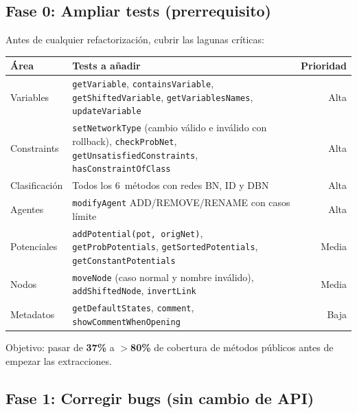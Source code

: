 \documentclass[11pt,a4paper]{article}
\newcommand{\code}[1]{\texttt{#1}}
\begin{document}
\subsection{Fase 0: Ampliar tests (prerrequisito)}

Antes de cualquier refactorizaci\'on, cubrir las lagunas cr\'iticas:

\begin{center}
\footnotesize
\begin{tabular}{lp{8cm}r}
\toprule
\textbf{\'Area} & \textbf{Tests a a\~nadir} & \textbf{Prioridad} \\
\midrule
Variables & \code{getVariable}, \code{containsVariable},
            \code{getShiftedVariable}, \code{getVariablesNames},
            \code{updateVariable} & Alta \\
Constraints & \code{setNetworkType} (cambio v\'alido e inv\'alido con
              rollback), \code{checkProbNet},
              \code{getUnsatisfiedConstraints},
              \code{hasConstraintOfClass} & Alta \\
Clasificaci\'on & Todos los 6~m\'etodos con redes BN, ID y DBN & Alta \\
Agentes & \code{modifyAgent} ADD/REMOVE/RENAME con casos l\'imite & Alta \\
Potenciales & \code{addPotential(pot, origNet)},
              \code{getProbPotentials}, \code{getSortedPotentials},
              \code{getConstantPotentials} & Media \\
Nodos & \code{moveNode} (caso normal y nombre inv\'alido),
        \code{addShiftedNode}, \code{invertLink} & Media \\
Metadatos & \code{getDefaultStates}, \code{comment},
            \code{showCommentWhenOpening} & Baja \\
\bottomrule
\end{tabular}
\end{center}

Objetivo: pasar de \textbf{37\%} a \textbf{$>$80\%} de cobertura de
m\'etodos p\'ublicos antes de empezar las extracciones.

\subsection{Fase 1: Corregir bugs (sin cambio de API)}
\end{document}
